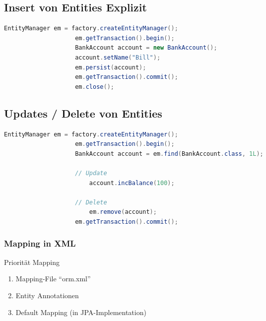 \documentclass[a4paper, landscape, 8pt]{scrartcl}
\begin{document}
\begin{multicols*}{4}
        \subsection{Insert von Entities \tiny{Explizit}}
        \begin{lstlisting}[language=java]
                    EntityManager em = factory.createEntityManager();
                    em.getTransaction().begin();
                    BankAccount account = new BankAccount();
                    account.setName("Bill");
                    em.persist(account);
                    em.getTransaction().commit();
                    em.close();
        \end{lstlisting}

        \subsection{Updates / Delete von Entities}
        \begin{lstlisting}[language=java]
                    EntityManager em = factory.createEntityManager();
                    em.getTransaction().begin();
                    BankAccount account = em.find(BankAccount.class, 1L);

                    // Update
                        account.incBalance(100);

                    // Delete
                        em.remove(account);
                    em.getTransaction().commit();
        \end{lstlisting}

        \subsubsection{Mapping in XML}
        Priorität Mapping
        \begin{enumerate}
            \item Mapping-File \enquote{orm.xml}
            \item Entity Annotationen
            \item Default Mapping (in JPA-Implementation)
        \end{enumerate}


\end{multicols*}
\end{document}
